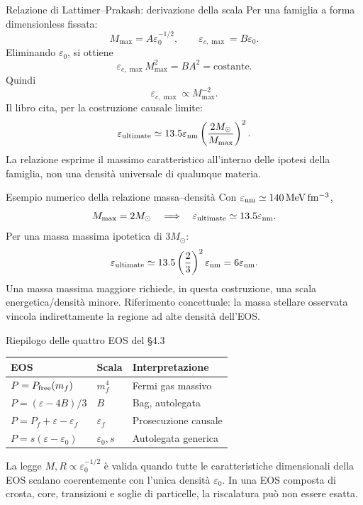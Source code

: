 \begin{frame}[t]{Relazione di Lattimer--Prakash: derivazione della scala}
\small
Per una famiglia a forma dimensionless fissata:
\[
M_{\max}=A\varepsilon_0^{-1/2},
\qquad\varepsilon_{c,\max}=B\varepsilon_0.
\]
Eliminando $\varepsilon_0$, si ottiene
\[
\varepsilon_{c,\max}M_{\max}^2=BA^2=\text{costante}.
\]
Quindi
\[
\varepsilon_{c,\max}\propto M_{\max}^{-2}.
\]
Il libro cita, per la costruzione causale limite:
\[
\varepsilon_{\rm ultimate}\simeq13.5\varepsilon_{\rm nm}
\left(\frac{2M_\odot}{M_{\max}}\right)^2.
\]
La relazione esprime il massimo caratteristico all'interno delle ipotesi della famiglia, non una densità universale di qualunque materia.
\end{frame}

\begin{frame}[t]{Esempio numerico della relazione massa--densità}
\small
Con $\varepsilon_{\rm nm}\simeq140\,\mathrm{MeV\,fm^{-3}}$,
\[
M_{\max}=2M_\odot\quad\Longrightarrow\quad
\varepsilon_{\rm ultimate}\simeq13.5\varepsilon_{\rm nm}.
\]
Per una massa massima ipotetica di $3M_\odot$:
\[
\varepsilon_{\rm ultimate}
\simeq13.5\left(\frac23\right)^2\varepsilon_{\rm nm}
=6\varepsilon_{\rm nm}.
\]
Una massa massima maggiore richiede, in questa costruzione, una scala energetica/densità minore.
\medskip
Riferimento concettuale: la massa stellare osservata vincola indirettamente la regione ad alte densità dell'EOS.
\end{frame}

\begin{frame}[t]{Riepilogo delle quattro EOS del §4.3}
\small
\begin{tabular}{@{}lll@{}}
\textbf{EOS} & \textbf{Scala} & \textbf{Interpretazione}\\\hline
$P=P_{\rm free}(m_f)$ & $m_f^4$ & Fermi gas massivo\\
$P=(\varepsilon-4B)/3$ & $B$ & Bag, autolegata\\
$P=P_f+\varepsilon-\varepsilon_f$ & $\varepsilon_f$ & Prosecuzione causale\\
$P=s(\varepsilon-\varepsilon_0)$ & $\varepsilon_0,s$ & Autolegata generica
\end{tabular}
\bigskip
La legge $M,R\propto\varepsilon_0^{-1/2}$ è valida quando tutte le caratteristiche dimensionali della EOS scalano coerentemente con l'unica densità $\varepsilon_0$.
\medskip
In una EOS composta di crosta, core, transizioni e soglie di particelle, la riscalatura può non essere esatta.
\end{frame}

